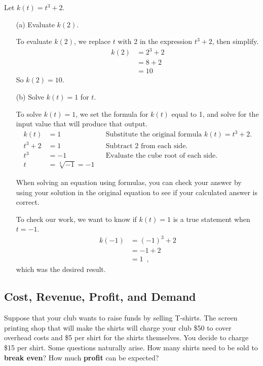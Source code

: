 \begin{example}
Let $k(t) = t^3 + 2$.
    \begin{itemize}
        \item[(a)] Evaluate $k(2)$.

        \begin{solution} To evaluate $k(2)$, we replace $t$ with 2 in the expression $t^3+2$, then simplify.
        \begin{align*}
            k(2) &= 2^3 + 2 \\
            &= 8 + 2 \\
            &= 10
        \end{align*}
        So $k(2) = 10$.
        \end{solution}
        \item[(b)] Solve $k(t) = 1$ for $t$.

        \begin{solution} To solve $k(t) = 1$, we set the formula for $k(t)$ equal to 1, and solve for the input value that will produce that output.
        \begin{align*}
            k(t)    &=  1 & &\mbox{Substitute the original formula } k(t) = t^3 + 2.\\
            t^3 + 2 &=  1 & &\mbox{Subtract 2 from each side}. \\
            t^3     &= -1 & &\mbox{Evaluate the cube root of each side.}\\
            t       &= \sqrt[3]{-1} = -1& &
        \end{align*}

When solving an equation using formulas, you can check your answer by using your solution in the original equation to see if your calculated answer is correct.

To check our work, we want to know if $k(t)=1$ is a true statement when $t=-1$.
    \begin{align*}
        k(-1) &= (-1)^3 + 2 \\
              &= -1 + 2 \\
              &= 1 \enspace ,
          \end{align*}
which was the desired result.
\end{solution}
    \end{itemize}
\end{example}


\subsection{Cost, Revenue, Profit, and Demand}
\label{ssec:cost}
Suppose that your club wants to raise funds by selling T-shirts. The screen printing shop that will make the shirts will charge your club \$50 to cover overhead costs and \$5 per shirt for the shirts themselves. You decide to charge \$15 per shirt. Some questions naturally arise. How many shirts need to be sold to {\bf break even}? How much {\bf profit} can be expected?

